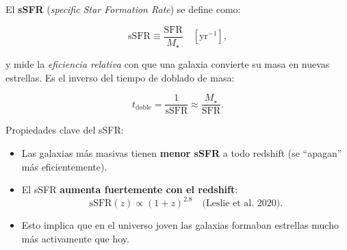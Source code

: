 \documentclass[12pt, a4paper]{article}
\begin{document}
El \textbf{sSFR} (\textit{specific Star Formation Rate}) se define como:

\begin{equation}
    \mathrm{sSFR} \equiv \frac{\mathrm{SFR}}{M_\star}
    \quad [\mathrm{yr}^{-1}],
    \label{eq:ssfr}
\end{equation}

y mide la \textit{eficiencia relativa} con que una galaxia convierte su masa
en nuevas estrellas. Es el inverso del tiempo de doblado de masa:

\begin{equation}
    t_{\mathrm{doble}} = \frac{1}{\mathrm{sSFR}}
    \approx \frac{M_\star}{\mathrm{SFR}}.
    \label{eq:tdouble}
\end{equation}

Propiedades clave del sSFR:
\begin{itemize}[leftmargin=2em]
    \item Las galaxias más masivas tienen \textbf{menor sSFR} a todo redshift
          (se ``apagan'' más eficientemente).
    \item El sSFR \textbf{aumenta fuertemente con el redshift}:
          \begin{equation}
              \mathrm{sSFR}(z) \propto (1+z)^{2.8}
              \quad \text{(Leslie et al.\ 2020)}.
          \end{equation}
    \item Esto implica que en el universo joven las galaxias formaban estrellas
          mucho más activamente que hoy.
\end{itemize}

\begin{center}
\end{center}
\end{document}
